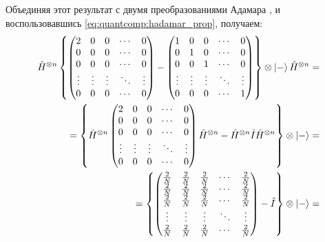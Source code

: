 Объединяя этот результат с двумя преобразованиями Адамара 
, и воспользовавшись
\eqref{eq:quantcomp:hadamar_prop}, 
получаем:
\begin{eqnarray}
\hat{H}^{\otimes n}
\left\{
\begin{pmatrix}
2  & 0 & 0 & \cdots & 0 \\
0 & 0 & 0 & \cdots & 0 \\
0 & 0 & 0 & \cdots & 0 \\
\vdots & \vdots & \vdots & \ddots & \vdots \\
0 & 0 & 0  & \cdots & 0 \\
\end{pmatrix} - 
\begin{pmatrix}
1 & 0 & 0 & \cdots & 0 \\
0 & 1 & 0 & \cdots & 0 \\
0 & 0 & 1 & \cdots & 0 \\
\vdots & \vdots & \vdots & \ddots & \vdots \\
0 & 0 & 0  & \cdots & 1  \\
\end{pmatrix}
\right\}
\otimes \ket{-}
\hat{H}^{\otimes n}
=
\nonumber \\
=
\left\{
\hat{H}^{\otimes n}
\begin{pmatrix}
2  & 0 & 0 & \cdots & 0 \\
0 & 0 & 0 & \cdots & 0 \\
0 & 0 & 0 & \cdots & 0 \\
\vdots & \vdots & \vdots & \ddots & \vdots \\
0 & 0 & 0  & \cdots & 0 \\
\end{pmatrix}
\hat{H}^{\otimes n}
- \hat{H}^{\otimes n} \hat{I} \hat{H}^{\otimes n}
\right\}
\otimes \ket{-}
 = 
\nonumber \\
=
\left\{
\begin{pmatrix}
\frac{2}{N}  & \frac{2}{N} & \frac{2}{N} & \cdots & \frac{2}{N} \\
\frac{2}{N} & \frac{2}{N} & \frac{2}{N} & \cdots & \frac{2}{N} \\
\frac{2}{N} & \frac{2}{N} & \frac{2}{N} & \cdots & \frac{2}{N} \\
\vdots & \vdots & \vdots & \ddots & \vdots \\
\frac{2}{N} & \frac{2}{N} & \frac{2}{N} & \cdots & \frac{2}{N} \\
\end{pmatrix} - \hat{I}
\right\}
\otimes \ket{-}
=
\nonumber \\

\end{eqnarray}
